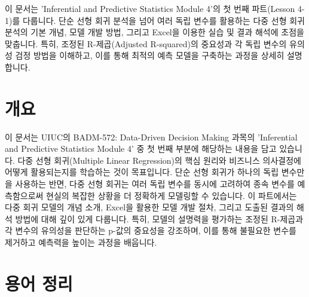\documentclass[11pt,a4paper]{article}
\begin{document}
\begin{summarybox}
이 문서는 'Inferential and Predictive Statistics Module 4'의 첫 번째 파트(Lesson 4-1)를 다룹니다.
단순 선형 회귀 분석을 넘어 여러 독립 변수를 활용하는 다중 선형 회귀 분석의 기본 개념, 모델 개발 방법, 그리고 Excel을 이용한 실습 및 결과 해석에 초점을 맞춥니다.
특히, 조정된 R-제곱(Adjusted R-squared)의 중요성과 각 독립 변수의 유의성 검정 방법을 이해하고, 이를 통해 최적의 예측 모델을 구축하는 과정을 상세히 설명합니다.
\end{summarybox}

\newpage
\section*{개요}
이 문서는 UIUC의 BADM-572: Data-Driven Decision Making 과목의 'Inferential and Predictive Statistics Module 4' 중 첫 번째 부분에 해당하는 내용을 담고 있습니다.
다중 선형 회귀(Multiple Linear Regression)의 핵심 원리와 비즈니스 의사결정에 어떻게 활용되는지를 학습하는 것이 목표입니다.
단순 선형 회귀가 하나의 독립 변수만을 사용하는 반면, 다중 선형 회귀는 여러 독립 변수를 동시에 고려하여 종속 변수를 예측함으로써 현실의 복잡한 상황을 더 정확하게 모델링할 수 있습니다.
이 파트에서는 다중 회귀 모델의 개념 소개, Excel을 활용한 모델 개발 절차, 그리고 도출된 결과의 해석 방법에 대해 깊이 있게 다룹니다.
특히, 모델의 설명력을 평가하는 조정된 R-제곱과 각 변수의 유의성을 판단하는 p-값의 중요성을 강조하며, 이를 통해 불필요한 변수를 제거하고 예측력을 높이는 과정을 배웁니다.

\newpage
\section*{용어 정리}
\end{document}
